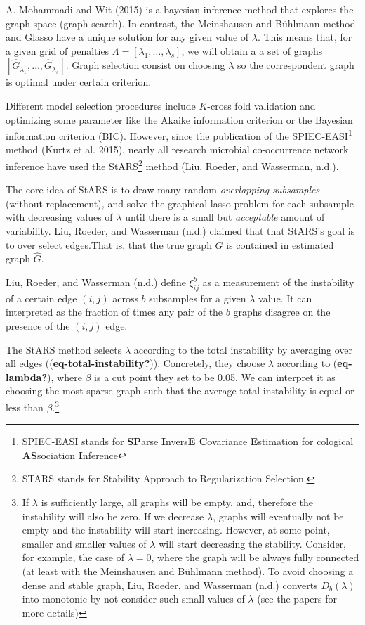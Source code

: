 \documentclass[
]{article}
\begin{document}
A. Mohammadi and Wit (2015) is a bayesian inference method that explores
the graph space (graph search). In contrast, the Meinshausen and
Bühlmann method and Glasso have a unique solution for any given value of
\(\lambda\). This means that, for a given grid of penalties
\(\Lambda=[\lambda_1, \dots, \lambda_s]\), we will obtain a a set of
graphs \([\hat G_{\lambda_1}, \dots, \hat G_{\lambda_s}]\). Graph
selection consist on choosing \(\lambda\) so the correspondent graph is
optimal under certain criterion.

Different model selection procedures include \(K\)-cross fold validation
and optimizing some parameter like the Akaike information criterion or
the Bayesian information criterion (BIC). However, since the publication
of the SPIEC-EASI\footnote{SPIEC-EASI stands for \textbf{SP}arse
  \textbf{I}nvers\textbf{E C}ovariance \textbf{E}stimation for cological
  \textbf{AS}sociation \textbf{I}nference} method (Kurtz et al. 2015),
nearly all research microbial co-occurrence network inference have used
the StARS\footnote{STARS stands for Stability Approach to Regularization
  Selection.} method (Liu, Roeder, and Wasserman, n.d.).

The core idea of StARS is to draw many random \emph{overlapping
subsamples} (without replacement)\emph{,} and solve the graphical lasso
problem for each subsample with decreasing values of \(\lambda\) until
there is a small but \emph{acceptable} amount of variability. Liu,
Roeder, and Wasserman (n.d.) claimed that that StARS's goal is to over
select edges.That is, that the true graph \(G\) is contained in
estimated graph \(\hat G\).

Liu, Roeder, and Wasserman (n.d.) define \(\xi^b_{ij}\) as a measurement
of the instability of a certain edge \((i, j)\) across \(b\) subsamples
for a given \(\lambda\) value. It can interpreted as the fraction of
times any pair of the \(b\) graphs disagree on the presence of the
\((i, j)\) edge.

The StARS method selects \(\lambda\) according to the total instability
by averaging over all edges ((\textbf{eq-total-instability?})).
Concretely, they choose \(\lambda\) according to (\textbf{eq-lambda?}),
where \(\beta\) is a cut point they set to be 0.05. We can interpret it
as choosing the most sparse graph such that the average total
instability is equal or less than \(\beta\).\footnote{If \(\lambda\) is
  sufficiently large, all graphs will be empty, and, therefore the
  instability will also be zero. If we decrease \(\lambda\), graphs will
  eventually not be empty and the instability will start increasing.
  However, at some point, smaller and smaller values of \(\lambda\) will
  start decreasing the stability. Consider, for example, the case of
  \(\lambda=0\), where the graph will be always fully connected (at
  least with the Meinshausen and Bühlmann method). To avoid choosing a
  dense and stable graph, Liu, Roeder, and Wasserman (n.d.) converts
  \(D_b(\lambda)\) into monotonic by not consider such small values of
  \(\lambda\) (see the papers for more details)}
\end{document}
